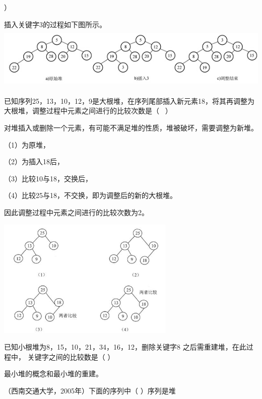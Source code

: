 ）
\par{}
\begin{solution}插入关键字3的过程如下图所示。
\includegraphics[width=5.85417in,height=1.18750in]{computerassets/2442b2878aef21035ef5b347f9b1bdcf.jpeg}
\end{solution}
\question 已知序列25，13，10，12，9是大根堆，在序列尾部插入新元素18，将其再调整为大根堆，调整过程中元素之间进行的比较次数是（
~）
\par{}
\begin{solution}对堆插入或删除一个元素，有可能不满足堆的性质，堆被破坏，需要调整为新堆。

（1）为原堆，

（2）为插入18后，

（3）比较10与18，交换后，

（4）比较25与18，不交换，即为调整后的新的大根堆。

因此调整过程中元素之间进行的比较次数为2。

\includegraphics[width=3.33333in,height=2.23958in]{computerassets/fbd0f5bd21064b67a7bed1e8b35715bf.png}
\end{solution}
\question 已知小根堆为8，15，10，21，34，16，12，删除关键字8
之后需重建堆，在此过程中， 关键字之间的比较数是（ ）
\par{}
\begin{solution}最小堆的概念和最小堆的重建。
\end{solution}
\question （西南交通大学，2005年）下面的序列中（ ）序列是堆
